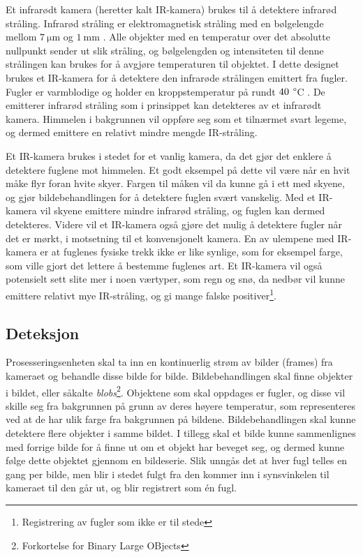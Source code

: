 Et infrarødt kamera (heretter kalt IR-kamera) brukes til å detektere infrarød stråling. 
Infrarød stråling er elektromagnetisk stråling med en bølgelengde mellom $\SI{7}{\micro\meter}$ og $\SI{1}{\milli\meter}$ \cite{SNL-IR}.
Alle objekter med en temperatur over det absolutte nullpunkt sender ut slik stråling, og bølgelengden og intensiteten til denne strålingen kan brukes for å avgjøre temperaturen til objektet. 
I dette designet brukes et IR-kamera for å detektere den infrarøde strålingen emittert fra fugler. 
Fugler er varmblodige og holder en kroppstemperatur på rundt $\SI{40}\:{\degree}$C \cite{snlfugl}.
De emitterer infrarød stråling som i prinsippet kan detekteres av et infrarødt kamera.
Himmelen i bakgrunnen vil oppføre seg som et tilnærmet svart legeme, og dermed emittere en relativt mindre mengde IR-stråling.

Et IR-kamera brukes i stedet for et vanlig kamera, da det gjør det enklere å detektere fuglene mot himmelen. 
Et godt eksempel på dette vil være når en hvit måke flyr foran hvite skyer. 
Fargen til måken vil da kunne gå i ett med skyene, og gjør bildebehandlingen for å detektere fuglen svært vanskelig. 
Med et IR-kamera vil skyene emittere mindre infrarød stråling, og fuglen kan dermed detekteres. 
Videre vil et IR-kamera også gjøre det mulig å detektere fugler når det er mørkt, i motsetning til et konvensjonelt kamera. 
En av ulempene med IR-kamera er at fuglenes fysiske trekk ikke er like synlige, som for eksempel farge, som ville gjort det lettere å bestemme fuglenes art.
Et IR-kamera vil også potensielt sett slite mer i noen værtyper, som regn og snø, da nedbør vil kunne emittere relativt mye IR-stråling, og gi mange falske positiver\footnote{Registrering av fugler som ikke er til stede}.

\subsection{Deteksjon}\label{sec:design:deteksjon}

Prosesseringsenheten skal ta inn en kontinuerlig strøm av bilder (frames) fra kameraet og behandle disse bilde for bilde. 
Bildebehandlingen skal finne objekter i bildet, eller såkalte \textit{blobs}\footnote{Forkortelse for Binary Large OBjects}. 
Objektene som skal oppdages er fugler, og disse vil skille seg fra bakgrunnen på grunn av deres høyere temperatur, som representeres ved at de har ulik farge fra bakgrunnen på bildene. 
Bildebehandlingen skal kunne detektere flere objekter i samme bildet. 
I tillegg skal et bilde kunne sammenlignes med forrige bilde for å finne ut om et objekt har beveget seg, og dermed kunne følge dette objektet gjennom en bildeserie. 
Slik unngås det at hver fugl telles en gang per bilde, men blir i stedet fulgt fra den kommer inn i synsvinkelen til kameraet til den går ut, og blir registrert som én fugl.

